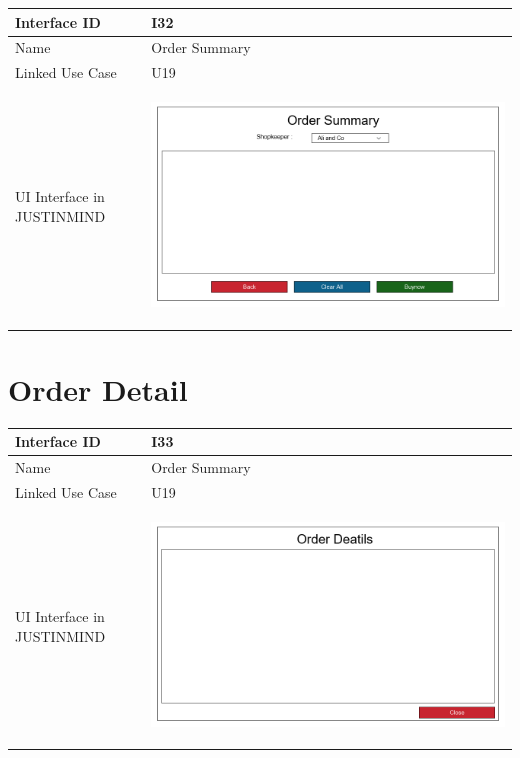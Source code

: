 \documentclass[12pt,a4paper]{report}
\begin{document}
\begin{tabular}{ | m{3cm} | m{12cm}| } \hline

Interface ID & I32  \\\hline

Name  &Order Summary\\ \hline

Linked Use Case & U19	 \\ \hline

UI Interface in JUSTINMIND & \begin{center} \includegraphics[scale=0.3]{./User Interface/UI-031 Order Summary@1x.png}\end{center}  \\ \hline
\end{tabular}
\section{Order Detail}

\begin{tabular}{ | m{3cm} | m{12cm}| } \hline

Interface ID & I33  \\\hline

Name  &Order Summary\\ \hline

Linked Use Case & U19	 \\ \hline

UI Interface in JUSTINMIND & \begin{center} \includegraphics[scale=0.3]{./User Interface/UI-032 Order Details@1x.png}\end{center}  \\ \hline
\end{tabular}
\end{document}
